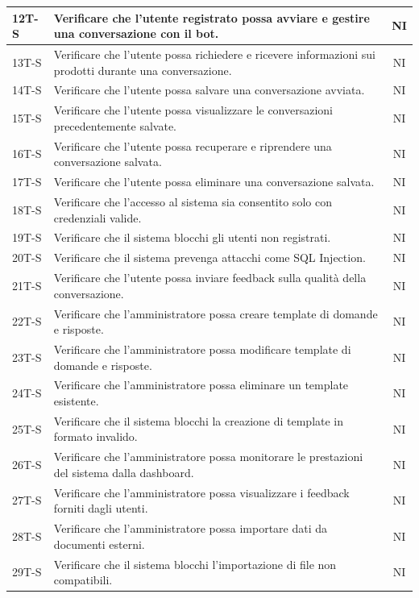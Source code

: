 \documentclass{article}
\begin{document}
\begin{longtable}{|>{\centering\arraybackslash}m{}|>{\raggedright\arraybackslash}m{}|c|}
    \hline
    12T-S & Verificare che l’utente registrato possa avviare e gestire una conversazione con il bot. & NI \\
    \hline
    13T-S & Verificare che l’utente possa richiedere e ricevere informazioni sui prodotti durante una conversazione. & NI \\
    \hline
    14T-S & Verificare che l’utente possa salvare una conversazione avviata. & NI \\
    \hline
    15T-S & Verificare che l’utente possa visualizzare le conversazioni precedentemente salvate. & NI \\
    \hline
    16T-S & Verificare che l’utente possa recuperare e riprendere una conversazione salvata. & NI \\
    \hline
    17T-S & Verificare che l’utente possa eliminare una conversazione salvata. & NI \\
    \hline
    18T-S & Verificare che l’accesso al sistema sia consentito solo con credenziali valide. & NI \\
    \hline
    19T-S & Verificare che il sistema blocchi gli utenti non registrati. & NI \\
    \hline
    20T-S & Verificare che il sistema prevenga attacchi come SQL Injection. & NI \\
    \hline
    21T-S & Verificare che l’utente possa inviare feedback sulla qualità della conversazione. & NI \\
    \hline
    22T-S & Verificare che l’amministratore possa creare template di domande e risposte. & NI \\
    \hline
    23T-S & Verificare che l’amministratore possa modificare template di domande e risposte. & NI \\
    \hline
    24T-S & Verificare che l’amministratore possa eliminare un template esistente. & NI \\
    \hline
    25T-S & Verificare che il sistema blocchi la creazione di template in formato invalido. & NI \\
    \hline
    26T-S & Verificare che l’amministratore possa monitorare le prestazioni del sistema dalla dashboard. & NI \\
    \hline
    27T-S & Verificare che l’amministratore possa visualizzare i feedback forniti dagli utenti. & NI \\
    \hline
    28T-S & Verificare che l’amministratore possa importare dati da documenti esterni. & NI \\
    \hline
    29T-S & Verificare che il sistema blocchi l’importazione di file non compatibili. & NI \\

\end{longtable}
\end{document}
